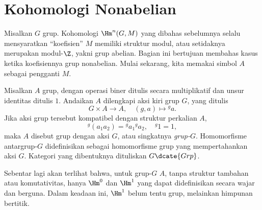 
\section{Kohomologi Nonabelian}\label{sec:nonabelian-coh}
\hypertarget{o014.aljabr2.chapter6.nonabelian-cohomology}{ }
Misalkan $G$ grup. Kohomologi $\Hm^n(G,M)$ yang dibahas sebelumnya selalu
mensyaratkan ``koefisien'' $M$ memiliki struktur modul, atau setidaknya
merupakan modul-$\Z$, yakni grup abelian. Bagian ini bertujuan membahas kasus
ketika koefisiennya grup nonabelian. Mulai sekarang, kita memakai simbol $A$
sebagai pengganti $M$.

\begin{definisi}\label{def:G-group}
	Misalkan $A$ grup, dengan operasi biner ditulis secara multiplikatif dan
	unsur identitas ditulis $1$. Andaikan $A$ dilengkapi aksi kiri grup $G$,
	yang ditulis
	\[ G \times A \to A, \quad (g, a) \mapsto {}^g a . \]
	Jika aksi grup tersebut kompatibel dengan struktur perkalian $A$,
	\[ {}^g (a_1 a_2) = {}^g a_1 {}^g a_2, \quad {}^g 1 = 1, \]
	maka $A$ disebut grup dengan aksi $G$, atau singkatnya \emph{grup-$G$}.
	Homomorfisme antargrup-$G$ didefinisikan sebagai homomorfisme grup
	yang mempertahankan aksi $G$. Kategori yang dibentuknya dituliskan
	$G\dcate{Grp}$.
\end{definisi}

Sebentar lagi akan terlihat bahwa, untuk grup-$G$ $A$, tanpa struktur tambahan
atau komutativitas, hanya $\Hm^0$ dan $\Hm^1$ yang dapat didefinisikan secara
wajar dan berguna. Dalam keadaan ini, $\Hm^1$ belum tentu grup, melainkan
himpunan bertitik.

